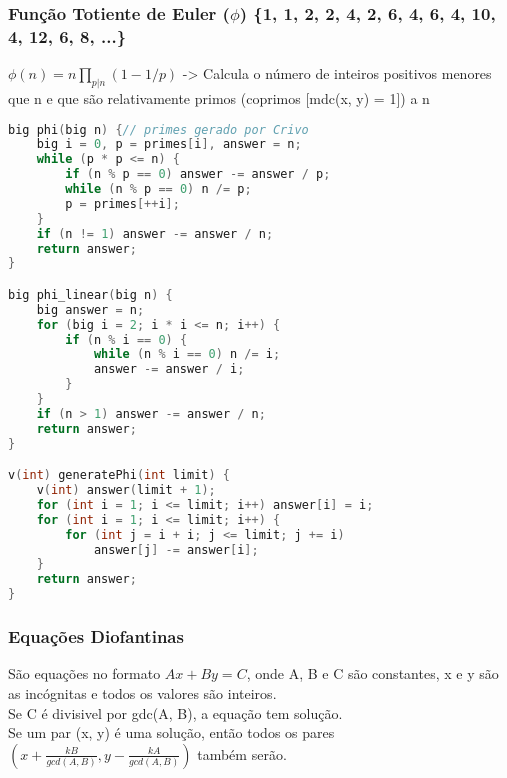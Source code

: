 \subsubsection*{Função Totiente de Euler (\(\phi\)) \{1, 1, 2, 2, 4, 2, 6, 4, 6, 4, 10, 4, 12, 6, 8, ...\}}
\large{\(\phi(n) = n \prod_{p | n} \left(1 - 1/p\right)\) -> Calcula o número de inteiros positivos menores que n e que são relativamente primos (coprimos [mdc(x, y) = 1]) a n}
\begin{lstlisting}[language=C++]
big phi(big n) {// primes gerado por Crivo
	big i = 0, p = primes[i], answer = n;
	while (p * p <= n) {
		if (n % p == 0) answer -= answer / p;
		while (n % p == 0) n /= p;
		p = primes[++i];
	}
	if (n != 1) answer -= answer / n;
	return answer;
}

big phi_linear(big n) {
    big answer = n;
    for (big i = 2; i * i <= n; i++) {
        if (n % i == 0) {
            while (n % i == 0) n /= i;
            answer -= answer / i;
        }
    }
    if (n > 1) answer -= answer / n;
    return answer;
}

v(int) generatePhi(int limit) {
    v(int) answer(limit + 1);
    for (int i = 1; i <= limit; i++) answer[i] = i;
    for (int i = 1; i <= limit; i++) {
        for (int j = i + i; j <= limit; j += i)
            answer[j] -= answer[i];
    }
    return answer;
}
\end{lstlisting}

\subsubsection*{Equações Diofantinas}
\large{
    São equações no formato \(Ax + By = C\), onde A, B e C são constantes, x e y são as incógnitas e todos os valores são inteiros.\\
    Se C é divisivel por gdc(A, B), a equação tem solução.\\
    Se um par (x, y) é uma solução, então todos os pares \(\left(x+\frac{kB}{gcd(A, B)}, y-\frac{kA}{gcd(A, B)}\right)\) também serão.
}
